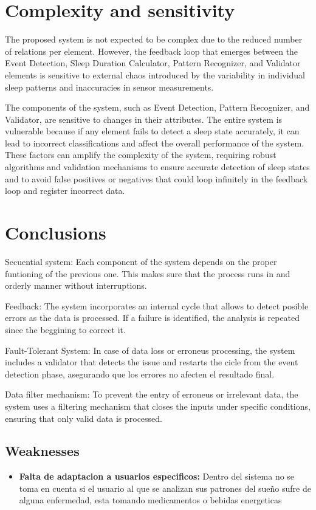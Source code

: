 \documentclass[conference]{IEEEtran}
\begin{document}
\section{Complexity and sensitivity}
The proposed system is not expected to be complex due to the reduced number of relations per element. However, the feedback 
loop that emerges between the Event Detection, Sleep Duration Calculator, Pattern Recognizer, and Validator elements is sensitive to 
external chaos introduced by the variability in individual sleep patterns and inaccuracies in sensor measurements. 

The components of the system, such as Event Detection, Pattern Recognizer, and Validator, are sensitive to changes in their attributes. The entire system is vulnerable because if any element
fails to detect a sleep state accurately, it can lead to incorrect classifications and affect the overall performance of the system.
These factors can amplify the complexity of the system, requiring robust algorithms and validation mechanisms to ensure accurate
detection of sleep states and to avoid false positives or negatives that could loop infinitely in the feedback loop and register incorrect
data.

\section{Conclusions}

Secuential system:
Each component of the system depends on the proper funtioning of the previous one. This makes sure that the process runs in and orderly manner without interruptions.

Feedback:
The system incorporates an internal cycle that allows to detect posible errors as the data is processed. If a failure is identified, the analysis is repeated since the beggining to correct it.

Fault-Tolerant System:
In case of data loss or erroneus processing, the system includes a validator that detects the issue and restarts the cicle from the event detection phase,  asegurando que los errores no afecten el resultado final.

Data filter mechanism:
To prevent the entry of erroneus or irrelevant data, the system uses a filtering mechanism that closes the inputs under specific conditions, ensuring that only valid data is processed.

\subsection{Weaknesses}

\begin{itemize}
    \item \textbf{Falta de adaptacion a usuarios especificos:} Dentro del sistema no se toma en cuenta si el usuario al que se analizan sus patrones del sueño sufre de alguna enfermedad, esta tomando medicamentos o bebidas energeticas 
    
\end{itemize}
\end{document}
